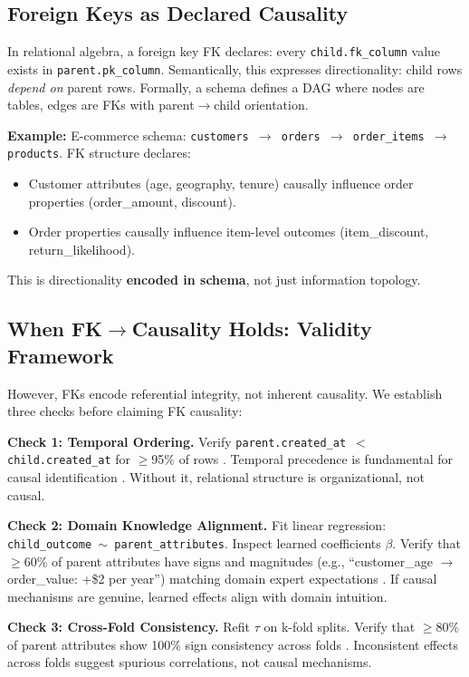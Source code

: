 \documentclass[11pt,letterpaper]{article}
\begin{document}
\subsection{Foreign Keys as Declared Causality}

In relational algebra, a foreign key FK declares: every \texttt{child.fk\_column} value exists in \texttt{parent.pk\_column}. Semantically, this expresses directionality: child rows \textit{depend on} parent rows. Formally, a schema defines a DAG where nodes are tables, edges are FKs with parent$\rightarrow$child orientation.

\textbf{Example:} E-commerce schema: \texttt{customers $\rightarrow$ orders $\rightarrow$ order\_items $\rightarrow$ products}. FK structure declares:
\begin{itemize}
\item Customer attributes (age, geography, tenure) causally influence order properties (order\_amount, discount).
\item Order properties causally influence item-level outcomes (item\_discount, return\_likelihood).
\end{itemize}

This is directionality \textbf{encoded in schema}, not just information topology.

\subsection{When FK$\rightarrow$Causality Holds: Validity Framework}

However, FKs encode referential integrity, not inherent causality. We establish three checks before claiming FK causality:

\textbf{Check 1: Temporal Ordering.} Verify \texttt{parent.created\_at $<$ child.created\_at} for $\geq$95\% of rows \cite{Pearl2009}. Temporal precedence is fundamental for causal identification \cite{Pearl2009}. Without it, relational structure is organizational, not causal.

\textbf{Check 2: Domain Knowledge Alignment.} Fit linear regression: \texttt{child\_outcome $\sim$ parent\_attributes}. Inspect learned coefficients $\beta$. Verify that $\geq$60\% of parent attributes have signs and magnitudes (e.g., ``customer\_age $\rightarrow$ order\_value: +\$2 per year'') matching domain expert expectations \cite{Zhu2022}. If causal mechanisms are genuine, learned effects align with domain intuition.

\textbf{Check 3: Cross-Fold Consistency.} Refit $\tau$ on k-fold splits. Verify that $\geq$80\% of parent attributes show 100\% sign consistency across folds \cite{Kunzel2019}. Inconsistent effects across folds suggest spurious correlations, not causal mechanisms.
\end{document}

